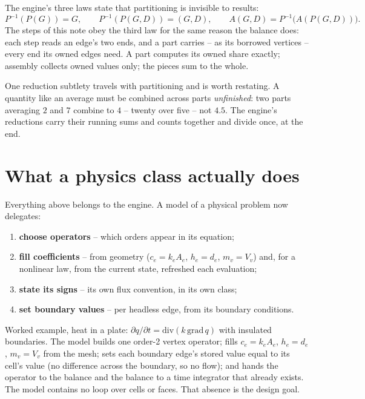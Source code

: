 \documentclass[11pt]{article}
\begin{document}
The engine's three laws state that partitioning is invisible to
results:
\[
P^{-1}(P(G)) = G, \qquad
P^{-1}(P(G,D)) = (G,D), \qquad
A(G,D) = P^{-1}\bigl(A(P(G,D))\bigr).
\]
The steps of this note obey the third law for the same reason the
balance does: each step reads an edge's two ends, and a part carries
-- as its borrowed vertices -- every end its owned edges need. A part
computes its owned share exactly; assembly collects owned values
only; the pieces sum to the whole.

One reduction subtlety travels with partitioning and is worth
restating. A quantity like an average must be combined across parts
\emph{unfinished}: two parts averaging $2$ and $7$ combine to $4$ --
twenty over five -- not $4.5$. The engine's reductions carry their
running sums and counts together and divide once, at the end.

\section{What a physics class actually does}\label{sec:delegation}

Everything above belongs to the engine. A model of a physical problem
now delegates:

\begin{enumerate}
  \item \textbf{choose operators} -- which orders appear in its
        equation;
  \item \textbf{fill coefficients} -- from geometry
        ($c_e = k_e A_e$, $h_e = d_e$, $m_v = V_v$) and, for a
        nonlinear law, from the current state, refreshed each
        evaluation;
  \item \textbf{state its signs} -- its own flux convention, in its
        own class;
  \item \textbf{set boundary values} -- per headless edge, from its
        boundary conditions.
\end{enumerate}

\noindent
Worked example, heat in a plate: $\partial q/\partial t =
\mathrm{div}(k\,\mathrm{grad}\,q)$ with insulated boundaries. The
model builds one order-2 vertex operator; fills $c_e = k_e A_e$,
$h_e = d_e$, $m_v = V_v$ from the mesh; sets each boundary edge's
stored value equal to its cell's value (no difference across the
boundary, so no flow); and hands the operator to the balance and the
balance to a time integrator that already exists. The model contains
no loop over cells or faces. That absence is the design goal.
\end{document}
